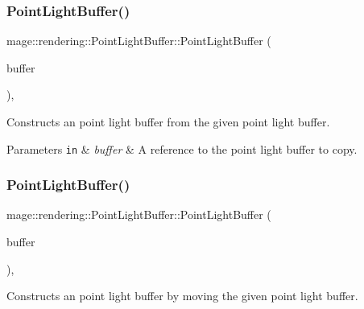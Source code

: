 \subsubsection{\texorpdfstring{Point\+Light\+Buffer()}{PointLightBuffer()}\hspace{0.1cm}{\footnotesize\ttfamily [2/3]}}
{\footnotesize\ttfamily mage\+::rendering\+::\+Point\+Light\+Buffer\+::\+Point\+Light\+Buffer (\begin{DoxyParamCaption}\item[{const \mbox{\hyperlink{structmage_1_1rendering_1_1_point_light_buffer}{Point\+Light\+Buffer}} \&}]{buffer }\end{DoxyParamCaption})\hspace{0.3cm}{\ttfamily [default]}, {\ttfamily [noexcept]}}

Constructs an point light buffer from the given point light buffer.


\begin{DoxyParams}[1]{Parameters}
\mbox{\tt in}  & {\em buffer} & A reference to the point light buffer to copy. \\
\hline
\end{DoxyParams}
\mbox{\label{structmage_1_1rendering_1_1_point_light_buffer_aabaa7e2bfbbf2c43aa2658f363f2c81e}} 
\subsubsection{\texorpdfstring{Point\+Light\+Buffer()}{PointLightBuffer()}\hspace{0.1cm}{\footnotesize\ttfamily [3/3]}}
{\footnotesize\ttfamily mage\+::rendering\+::\+Point\+Light\+Buffer\+::\+Point\+Light\+Buffer (\begin{DoxyParamCaption}\item[{\mbox{\hyperlink{structmage_1_1rendering_1_1_point_light_buffer}{Point\+Light\+Buffer}} \&\&}]{buffer }\end{DoxyParamCaption})\hspace{0.3cm}{\ttfamily [default]}, {\ttfamily [noexcept]}}

Constructs an point light buffer by moving the given point light buffer.



